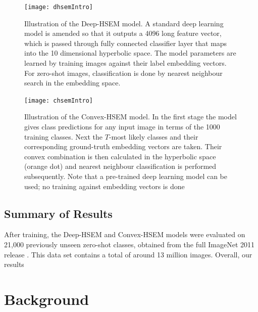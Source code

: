 \documentclass[12pt]{report}
\begin{document}
\begin{figure}
  \centering
	\texttt{[image: dhsemIntro]}
	\caption{Illustration of the Deep-HSEM model. A standard deep learning model is amended so that it outputs a 4096 long feature vector, which is passed through fully connected classifier layer that maps into the 10 dimensional hyperbolic space. The model parameters are learned by training images against their label embedding vectors. For zero-shot images, classification is done by nearest neighbour search in the embedding space.}
	\label{fig:dhsemIntro}
\end{figure}

\begin{figure}
  \centering
	\texttt{[image: chsemIntro]}
	\caption{Illustration of the Convex-HSEM model. In the first stage the model gives class predictions for any input image in terms of the 1000 training classes. Next the $T$-most likely classes and their corresponding ground-truth embedding vectors are taken. Their convex combination is then calculated in the hyperbolic space (orange dot) and nearest neighbour classification is performed subsequently. Note that a pre-trained deep learning model can be used; no training against embedding vectors is done}
	\label{fig:chsemIntro}
\end{figure}

\section{Summary of Results}

After training, the Deep-HSEM and Convex-HSEM models were evaluated on 21,000 previously unseen zero-shot classes, obtained from the full ImageNet 2011 release \cite{JiaDeng2009}. This data set contains a total of around 13 million images. Overall, our results

\newpage

\chapter{Background} \label{ch:backg}
\end{document}
